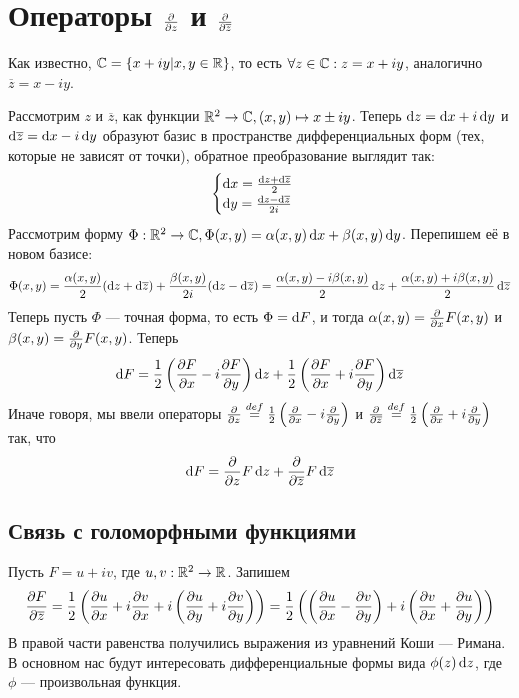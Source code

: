 \documentclass[a4paper]{report}
\begin{document}
    \section{Операторы $\der{}{z}$ и $\der{}{\overline{z}}$}
    Как известно, $\C = \defset{x + iy}{x, y \in \R}$, то есть $\forall z \in \C: z = x + iy$, аналогично $\overline{z} = x - iy$.

    Рассмотрим $z$ и $\overline{z}$, как функции $\R^2 \map \C, (x, y) \mapsto x \pm iy$.
    Теперь $\d z = \d x + i \d y$ и $\d \overline{z} = \d x - i \d y$ образуют базис в пространстве дифференциальных форм (тех, которые не зависят от точки), обратное преобразование выглядит так:
    \[\all{\d x = \frac{\d z + \d \overline{z}}{2} \\ \d y = \frac{\d z - \d \overline{z}}{2i}}\]
    Рассмотрим форму $\Phi: \R^2 \map \C, \Phi(x, y) = \alpha(x, y)\d x + \beta(x, y)\d y$.
    Перепишем её в новом базисе:
    \[\Phi(x, y) = \frac{\alpha(x, y)}{2}(\d z + \d \overline{z}) + \frac{\beta(x, y)}{2i}(\d z - \d\overline{z}) = \frac{\alpha(x, y) - i \beta(x, y)}{2}\d z + \frac{\alpha(x, y) + i \beta(x, y)}{2}\d \overline{z}\]
    Теперь пусть $\Phi$ --- точная форма, то есть $\Phi = \d F$, и тогда $\alpha(x, y) = \der{}{x}F(x, y)$ и $\beta(x, y) = \der{}{y}F(x, y)$. Теперь
    \[\d F = \frac{1}{2}\left(\der{F}{x} - i\der{F}{y}\right)\d z + \frac{1}{2}\left(\der{F}{x} + i \der{F}{y}\right)\d \overline{z}\]
    Иначе говоря, мы ввели операторы $\der{}{z} \bydef \frac{1}{2}\left(\der{}{x} - i\der{}{y}\right)$ и $\der{}{\overline{z}} \bydef \frac{1}{2}\left(\der{}{x} + i \der{}{y}\right)$ так, что \[\d F = \der{}{z}F\d z + \der{}{\overline{z}}F\d\overline{z}\]
    \subsection{Связь с голоморфными функциями}
    Пусть $F = u + iv$, где $u, v: \R^2 \map \R$.
    Запишем
    \[\der{F}{\overline{z}} = \frac{1}{2}\left(\der{u}{x} + i\der{v}{x} + i\left(\der{u}{y} + i\der{v}{y}\right)\right) = \frac12\left(\left(\der{u}{x} - \der{v}{y}\right) + i\left(\der{v}{x} + \der{u}{y}\right)\right)\]
    В правой части равенства получились выражения из уравнений Коши --- Римана.
    В основном нас будут интересовать дифференциальные формы вида $\phi(z)\d z$, где $\phi$ --- произвольная функция.
\end{document}
